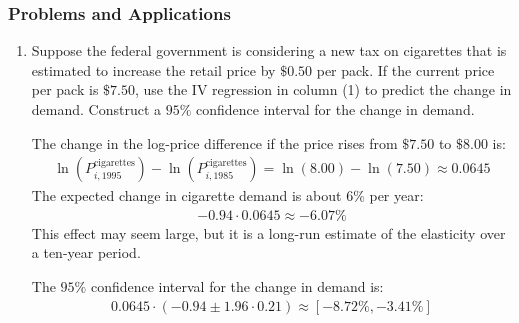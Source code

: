 \begin{frame}
\frametitle{Problems and Applications}

\begin{enumerate}\setcounter{enumi}{0}

\item Suppose the federal government is considering a new tax on cigarettes that is estimated to increase the retail price by $\$0.50$ per pack. If the current price per pack is $\$7.50$, use the IV regression in column (1) to predict the change in demand. Construct a $95\%$ confidence interval for the change in demand.

\begin{answer}
The change in the log-price difference if the price rises from $\$7.50$ to $\$8.00$ is:
\begin{align*}
\ln(P^{\text{cigarettes}}_{i,1995}) - \ln(P^{\text{cigarettes}}_{i,1985})
= \ln(8.00) - \ln(7.50) \approx 0.0645
\end{align*}
The expected change in cigarette demand is about $6\%$ per year:
\begin{align*}
-0.94 \cdot 0.0645 \approx -6.07\%
\end{align*}
This effect may seem large, but it is a long-run estimate of the elasticity over a ten-year period.

The $95\%$ confidence interval for the change in demand is:
\begin{align*}
0.0645 \cdot (-0.94 \pm 1.96 \cdot 0.21)
\approx [-8.72\%, -3.41\%]
\end{align*}
\end{answer}

\end{enumerate}

\end{frame}


